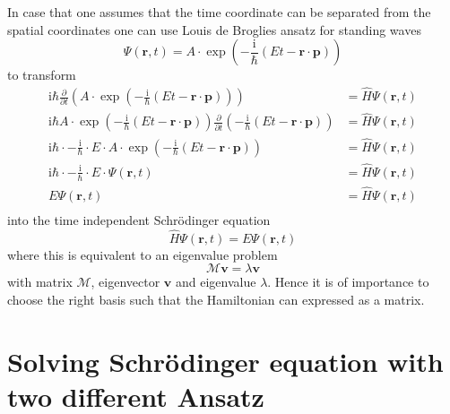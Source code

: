 \documentclass[12pt]{scrartcl}
\begin{document}
In case that one assumes that the time coordinate can be separated from the spatial coordinates one can use Louis de Broglies ansatz for standing waves
\begin{equation}
\Psi(\mathbf{r},t)=A\cdot \exp(-\frac{\mathrm{i}}{\hbar}(Et-\mathbf{r}\cdot\mathbf{p}))
\label{ansatz:louisdebroglieswave}
\end{equation}
to transform
\begin{align*}
\mathrm{i} \hbar \frac{\partial }{\partial t} (A\cdot \exp(-\frac{\mathrm{i}}{\hbar}(Et-\mathbf{r}\cdot\mathbf{p})) )&=\hat{H}\Psi(\mathbf{r},t)\\
\mathrm{i} \hbar  A\cdot \exp(-\frac{\mathrm{i}}{\hbar}(Et-\mathbf{r}\cdot\mathbf{p})) \frac{\partial }{\partial t}(-\frac{\mathrm{i}}{\hbar}(Et-\mathbf{r}\cdot\mathbf{p})) &=\hat{H}\Psi(\mathbf{r},t)\\
\mathrm{i} \hbar\cdot -\frac{\mathrm{i}}{\hbar} \cdot E \cdot A\cdot \exp(-\frac{\mathrm{i}}{\hbar}(Et-\mathbf{r}\cdot\mathbf{p}))  &=\hat{H}\Psi(\mathbf{r},t)\\
\mathrm{i} \hbar\cdot -\frac{\mathrm{i}}{\hbar} \cdot E \cdot \Psi(\mathbf{r},t)&=\hat{H}\Psi(\mathbf{r},t)\\
 E \Psi(\mathbf{r},t)&=\hat{H}\Psi(\mathbf{r},t)\\
\end{align*}
into the time independent Schr\"odinger equation
\begin{equation}
\hat{H}\Psi(\mathbf{r},t)=E \Psi(\mathbf{r},t)
\label{eq:tiseclassic}
\end{equation}
where this is equivalent to an eigenvalue problem
\begin{equation}
\mathcal{M} \mathbf{v} = \lambda \mathbf{v}
\label{eigenvalueproblem}
\end{equation}
with matrix $\mathcal{M}$, eigenvector $\mathbf{v}$ and eigenvalue $\lambda$. Hence it is of importance to choose the right basis such that the Hamiltonian can expressed as a matrix.

\section{Solving Schr\"odinger equation with two different Ansatz}
\end{document}
